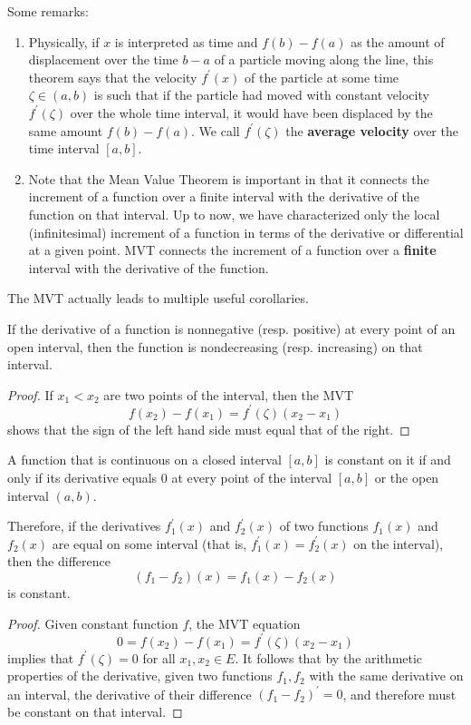 \documentclass{article}
\begin{document}
    Some remarks: 
    \begin{enumerate}
      \item Physically, if $x$ is interpreted as time and $f(b) - f(a)$ as the amount of displacement over the time $b-a$ of a particle moving along the line, this theorem says that the velocity $f^\prime (x)$ of the particle at some time $\zeta \in (a, b)$ is such that if the particle had moved with constant velocity $f^\prime (\zeta)$ over the whole time interval, it would have been displaced by the same amount $f(b) - f(a)$. We call $f^\prime (\zeta)$ the \textbf{average velocity} over the time interval $[a, b]$. 
      \item Note that the Mean Value Theorem is important in that it connects the increment of a function over a finite interval with the derivative of the function on that interval. Up to now, we have characterized only the local (infinitesimal) increment of a function in terms of the derivative or differential at a given point. MVT connects the increment of a function over a \textbf{finite} interval with the derivative of the function. 
    \end{enumerate}

    The MVT actually leads to multiple useful corollaries. 

    \begin{corollary}
    If the derivative of a function is nonnegative (resp. positive) at every point of an open interval, then the function is nondecreasing (resp. increasing) on that interval. 
    \end{corollary}
    \begin{proof}
    If $x_1 < x_2$ are two points of the interval, then the MVT
    \[f(x_2) - f(x_1) = f^\prime (\zeta) (x_2 - x_1)\]
    shows that the sign of the left hand side must equal that of the right. 
    \end{proof}

    \begin{corollary}
    A function that is continuous on a closed interval $[a,b]$ is constant on it if and only if its derivative equals $0$ at every point of the interval $[a,b]$ or the open interval $(a, b)$. 

    Therefore, if the derivatives $f_1^\prime (x)$ and $f_2^\prime (x)$ of two functions $f_1 (x)$ and $f_2 (x)$ are equal on some interval (that is, $f_1^\prime (x) = f_2^\prime (x)$ on the interval), then the difference
    \[(f_1 - f_2) (x) = f_1 (x) - f_2 (x)\]
    is constant. 
    \end{corollary}
    \begin{proof}
    Given constant function $f$, the MVT equation 
    \[0 = f(x_2) - f(x_1) = f^\prime (\zeta) (x_2 - x_1)\]
    implies that $f^\prime (\zeta) = 0$ for all $x_1, x_2 \in E$. It follows that by the arithmetic properties of the derivative, given two functions $f_1, f_2$ with the same derivative on an interval, the derivative of their difference $(f_1 - f_2)^\prime = 0$, and therefore must be constant on that interval. 
    \end{proof}
\end{document}
